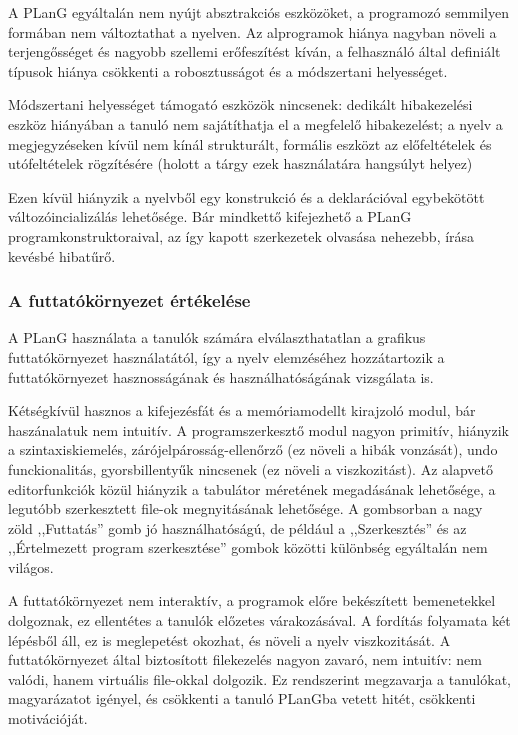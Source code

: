 A PLanG egyáltalán nem nyújt absztrakciós eszközöket, a programozó semmilyen formában nem változtathat a nyelven.
Az alprogramok hiánya nagyban növeli a terjengősséget és nagyobb szellemi erőfeszítést kíván, a felhasználó által definiált típusok hiánya csökkenti a robosztusságot és a módszertani helyességet.

Módszertani helyességet támogató eszközök nincsenek: dedikált hibakezelési eszköz hiányában a tanuló nem sajátíthatja el a megfelelő hibakezelést; a nyelv a megjegyzéseken kívül nem kínál strukturált, formális eszközt az előfeltételek és utófeltételek rögzítésére (holott a tárgy ezek használatára hangsúlyt helyez)

Ezen kívül hiányzik a nyelvből egy  konstrukció és a deklarációval egybekötött változóincializálás lehetősége. Bár mindkettő kifejezhető a PLanG programkonstruktoraival, az így kapott szerkezetek olvasása nehezebb, írása kevésbé hibatűrő.


\subsubsection{A futtatókörnyezet értékelése}
A PLanG használata a tanulók számára elválaszthatatlan a grafikus futtatókörnyezet használatától, így a nyelv elemzéséhez hozzátartozik a futtatókörnyezet hasznosságának és használhatóságának vizsgálata is.

Kétségkívül hasznos a kifejezésfát és a memóriamodellt kirajzoló modul, bár haszánalatuk nem intuitív.
A programszerkesztő modul nagyon primitív, hiányzik a szintaxiskiemelés, zárójelpárosság-ellenőrző (ez növeli a hibák vonzását), undo funckionalitás, gyorsbillentyűk nincsenek (ez növeli a viszkozitást).
Az alapvető editorfunkciók közül hiányzik a tabulátor méretének megadásának lehetősége, a legutóbb szerkesztett file-ok megnyitásának lehetősége.
A gombsorban a nagy zöld ,,Futtatás'' gomb jó használhatóságú, de például a ,,Szerkesztés'' és az ,,Értelmezett program szerkesztése'' gombok közötti különbség egyáltalán nem világos.

A futtatókörnyezet nem interaktív, a programok előre bekészített bemenetekkel dolgoznak, ez ellentétes a tanulók előzetes várakozásával.
A fordítás folyamata két lépésből áll, ez is meglepetést okozhat, és növeli a nyelv viszkozitását.
A futtatókörnyezet által biztosított filekezelés nagyon zavaró, nem intuitív: nem valódi, hanem virtuális file-okkal dolgozik.
Ez rendszerint megzavarja a tanulókat, magyarázatot igényel, és csökkenti a tanuló PLanGba vetett hitét, csökkenti motivációját.


